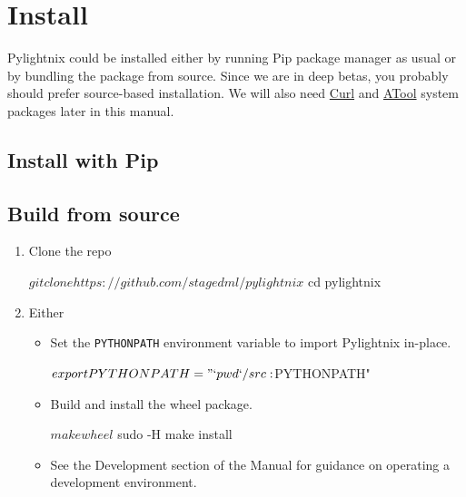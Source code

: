 \section{Install}

Pylightnix could be installed either by running Pip package manager as usual or
by bundling the package from source. Since we are in deep betas, you probably
should prefer source-based installation. We will also need
\href{https://curl.se/}{Curl} and \href{https://www.nongnu.org/atool/}{ATool}
system packages later in this manual.

\subsection{Install with Pip}


\subsection{Build from source}

\begin{enumerate}
  \item Clone the repo
    \begin{shellcode}
    $ git clone https://github.com/stagedml/pylightnix
    $ cd pylightnix
    \end{shellcode}
  \item Either
    \begin{itemize}
      \item Set the \texttt{PYTHONPATH} environment variable to import
        Pylightnix in-place.
        \begin{shellcode}
        $ export PYTHONPATH="`pwd`/src:$PYTHONPATH"
        \end{shellcode}
      \item Build and install the wheel package.
        \begin{shellcode}
        $ make wheel
        $ sudo -H make install
        \end{shellcode}
      \item See the Development section of the Manual for guidance on operating
        a development environment.
    \end{itemize}
\end{enumerate}

